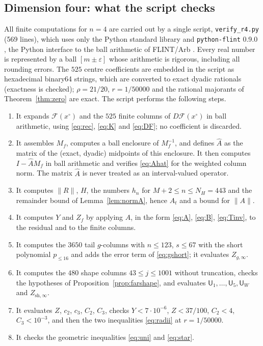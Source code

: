 \documentclass[11pt]{amsart}
\theoremstyle{definition}
\theoremstyle{remark}
\numberwithin{equation}{section}
\newcommand{\Fc}{\mathcal{F}}
\newcommand{\sU}{\mathsf{U}}
\newcommand{\nrm}[1]{\lVert #1\rVert}
\begin{document}
\subsection{Dimension four: what the script checks}
All finite computations for $n=4$ are carried out by a single script, \texttt{verify\_r4.py} (569 lines), which uses only the Python standard library and \texttt{python-flint} 0.9.0 \cite{flint}, the Python interface to the ball arithmetic of FLINT/Arb \cite{Joh17}. Every real number is represented by a ball $[m\pm\varepsilon]$ whose arithmetic is rigorous, including all rounding errors. The $525$ centre coefficients are embedded in the script as hexadecimal binary64 strings, which are converted to exact dyadic rationals (exactness is checked); $\rho=21/20$, $r=1/50000$ and the rational majorants of Theorem~\ref{thm:zero} are exact. The script performs the following steps.
\begin{enumerate}[label=(\arabic*)]
\item It expands $\Fc(x^\circ)$ and the $525$ finite columns of $D\Fc(x^\circ)$ in ball arithmetic, using \eqref{eq:rec}, \eqref{eq:K} and \eqref{eq:DF}; no coefficient is discarded.
\item It assembles $M_f$, computes a ball enclosure of $M_f^{-1}$, and defines $\widehat A$ as the matrix of the (exact, dyadic) midpoints of this enclosure. It then computes $I-\widehat AM_f$ in ball arithmetic and verifies \eqref{eq:Ahat} for the weighted column norm. The matrix $\widehat A$ is never treated as an interval-valued operator.
\item It computes $\nrm R$, $H$, the numbers $h_n$ for $M+2\leq n\leq N_H=443$ and the remainder bound of Lemma~\ref{lem:normA}, hence $A_t$ and a bound for $\nrm A$.
\item It computes $Y$ and $Z_f$ by applying $A$, in the form \eqref{eq:A}, \eqref{eq:B}, \eqref{eq:Tinv}, to the residual and to the finite columns.
\item It computes the $3650$ tail $g$-columns with $n\leq123$, $s\leq67$ with the short polynomial $p_{\leq16}$ and adds the error term of \eqref{eq:gshort}; it evaluates $Z_{g,\infty}$.
\item It computes the $480$ shape columns $43\leq j\leq1001$ without truncation, checks the hypotheses of Proposition~\ref{prop:farshape}, and evaluates $\sU_1,\ldots,\sU_5,\sU_W$ and $Z_{\mathrm{sh},\infty}$.
\item It evaluates $Z$, $c_2$, $c_3$, $C_2$, $C_3$, checks $Y<7\cdot10^{-6}$, $Z<37/100$, $C_2<4$, $C_3<10^{-3}$, and then the two inequalities \eqref{eq:radii} at $r=1/50000$.
\item It checks the geometric inequalities \eqref{eq:uni} and \eqref{eq:star}.
\end{enumerate}
\end{document}
